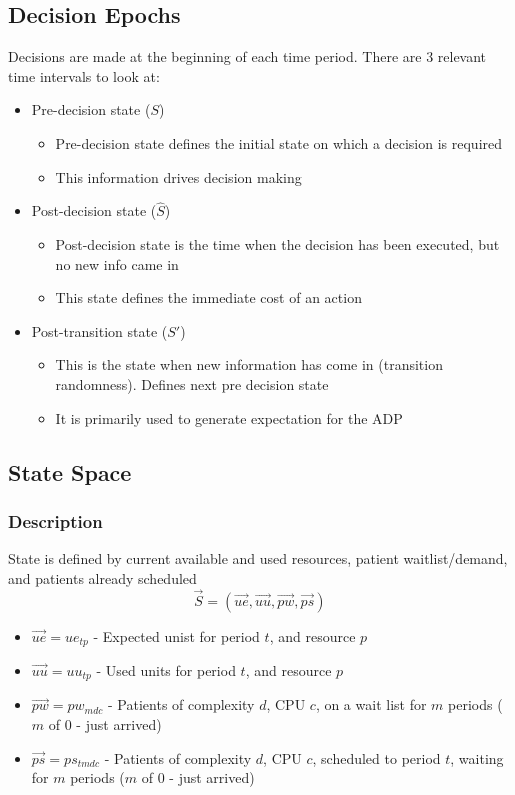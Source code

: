 \documentclass{article}
\begin{document}
\subsection{Decision Epochs}
Decisions are made at the beginning of each time period. There are 3 relevant time intervals to look at:
\begin{itemize}
	\item Pre-decision state ($S$)
	\begin{itemize}
		\item Pre-decision state defines the initial state on which a decision is required
		\item This information drives decision making
	\end{itemize}

	\item Post-decision state ($\hat{S}$)
	\begin{itemize}
		\item Post-decision state is the time when the decision has been executed, but no new info came in
		\item This state defines the immediate cost of an action
	\end{itemize} 

	\item Post-transition state ($S'$)
	\begin{itemize}
		\item This is the state when new information has come in (transition randomness). Defines next pre decision state
		\item It is primarily used to generate expectation for the ADP
	\end{itemize}
\end{itemize}

\subsection{State Space}
\subsubsection{Description}
State is defined by current available and used resources, patient waitlist/demand, and patients already scheduled
\[  \vec{S}  = (\vec{ue}, \vec{uu}, \vec{pw}, \vec{ps}) \]
\begin{itemize}
    \item $\vec{ue} = ue_{tp}$ - Expected unist for  period $t$, and resource $p$
    \item $\vec{uu} = uu_{tp}$ - Used units for period $t$, and resource $p$
    \item $\vec{pw} = pw_{mdc}$ - Patients of complexity $d$, CPU $c$, on a wait list for $m$ periods ($m$ of 0 - just arrived)
    \item $\vec{ps} = ps_{tmdc}$ - Patients of complexity $d$, CPU $c$, scheduled to period $t$, waiting for $m$ periods ($m$ of 0 - just arrived)
\end{itemize}
\end{document}
